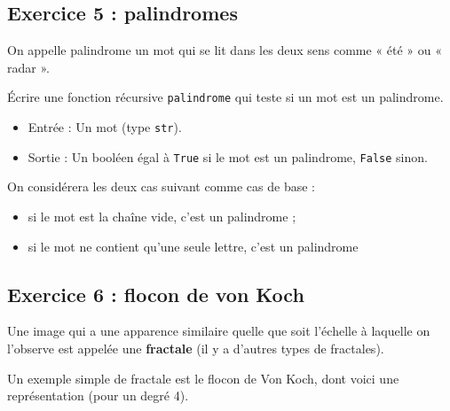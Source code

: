 \documentclass[
  letterpaper,
  DIV=11,
  numbers=noendperiod]{scrartcl}
\providecommand{\tightlist}{%
  \setlength{\itemsep}{0pt}\setlength{\parskip}{0pt}}\usepackage{longtable,booktabs,array}
\begin{document}
\hypertarget{fa-desktop-exercice-5-palindromes}{%
\subsection{\texorpdfstring{ Exercice 5 :
palindromes}{ Exercice 5 : palindromes}}\label{fa-desktop-exercice-5-palindromes}}

On appelle palindrome un mot qui se lit dans les deux sens comme « été »
ou « radar ».

Écrire une fonction récursive \texttt{palindrome} qui teste si un mot
est un palindrome.

\begin{itemize}
\tightlist
\item
  Entrée : Un mot (type \texttt{str}).
\item
  Sortie : Un booléen égal à \texttt{True} si le mot est un palindrome,
  \texttt{False} sinon.
\end{itemize}

On considérera les deux cas suivant comme cas de base :

\begin{itemize}
\tightlist
\item
  si le mot est la chaîne vide, c'est un palindrome ;
\item
  si le mot ne contient qu'une seule lettre, c'est un palindrome
\end{itemize}

\hypertarget{fa-solid-pencil-alt-fa-desktop-exercice-6-flocon-de-von-koch}{%
\subsection{\texorpdfstring{ 
Exercice 6 : flocon de von
Koch}{  Exercice 6 : flocon de von Koch}}\label{fa-solid-pencil-alt-fa-desktop-exercice-6-flocon-de-von-koch}}

Une image qui a une apparence similaire quelle que soit l'échelle à
laquelle on l'observe est appelée une \textbf{fractale} (il y a d'autres
types de fractales).

Un exemple simple de fractale est le flocon de Von Koch, dont voici une
représentation (pour un degré 4).
\end{document}
